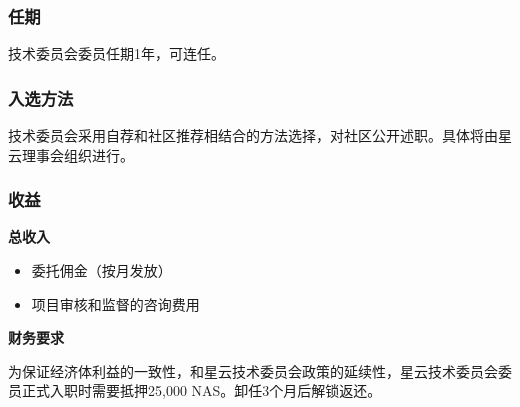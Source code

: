 \subsubsection{任期}

技术委员会委员任期1年，可连任。

\subsubsection{入选方法}

技术委员会采用自荐和社区推荐相结合的方法选择，对社区公开述职。具体将由星云理事会组织进行。

\subsubsection{收益}

\textbf{总收入}

\begin{itemize}
	\item 委托佣金（按月发放）
	\item 项目审核和监督的咨询费用
\end{itemize}

\vspace{2em}

\textbf{财务要求}

为保证经济体利益的一致性，和星云技术委员会政策的延续性，星云技术委员会委员正式入职时需要抵押25,000 NAS。卸任3个月后解锁返还。